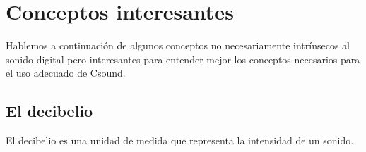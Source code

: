 
\section{Conceptos interesantes}\label{sec:Conceptos} 

Hablemos a continuación de algunos conceptos no necesariamente intrínsecos al sonido digital pero interesantes para entender mejor los conceptos necesarios para el uso adecuado de Csound.

\subsection{El decibelio}\label{sec:db} 

El decibelio es una unidad de medida que representa la intensidad de un sonido. 

